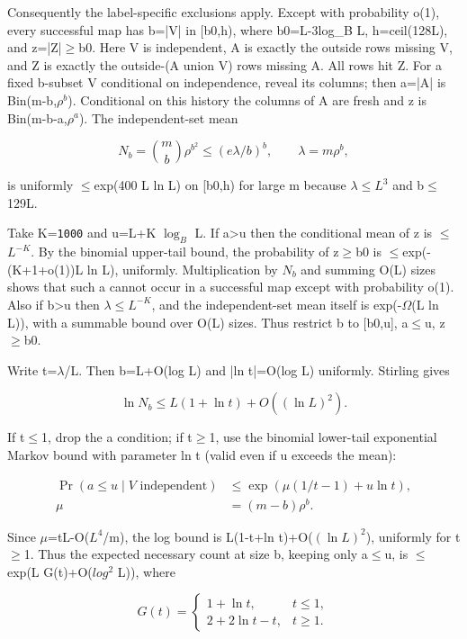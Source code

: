 \documentclass[11pt]{article}
\begin{document}
Consequently the label-specific exclusions apply. Except with probability o(1), every successful map has b=|V| in [b0,h), where b0=L-3log\_B L, h=ceil(128L), and z=|Z|\ensuremath{\geq}b0. Here V is independent, A is exactly the outside rows missing V, and Z is exactly the outside-(A union V) rows missing A. All rows hit Z. For a fixed b-subset V conditional on independence, reveal its columns; then a=|A| is Bin(m-b,$\rho^{b}$). Conditional on this history the columns of A are fresh and z is Bin(m-b-a,$\rho^{a}$). The independent-set mean

\[
N_b=\binom mb\rho^{b^2}\leq(e\lambda/b)^b,\qquad\lambda=m\rho^b,
\]

is uniformly \ensuremath{\leq}exp(400 L ln L) on [b0,h) for large m because $\lambda$\ensuremath{\leq}$L^{3}$ and b\ensuremath{\leq}129L.

Take K=\texttt{1000} and u=L+K $\log_B$ L. If a>u then the conditional mean of z is \ensuremath{\leq}$L^{-K}$. By the binomial upper-tail bound, the probability of z\ensuremath{\geq}b0 is \ensuremath{\leq}exp(-(K+1+o(1))L ln L), uniformly. Multiplication by $N_{b}$ and summing O(L) sizes shows that such a cannot occur in a successful map except with probability o(1). Also if b>u then $\lambda$\ensuremath{\leq}$L^{-K}$, and the independent-set mean itself is exp(-$\Omega$(L ln L)), with a summable bound over O(L) sizes. Thus restrict b to [b0,u], a\ensuremath{\leq}u, z\ensuremath{\geq}b0.

Write t=$\lambda$/L. Then b=L+O(log L) and |ln t|=O(log L) uniformly. Stirling gives

\[
\ln N_b\leq L(1+\ln t)+O((\ln L)^2).
\]

If t\ensuremath{\leq}1, drop the a condition; if t\ensuremath{\geq}1, use the binomial lower-tail exponential Markov bound with parameter ln t (valid even if u exceeds the mean):

\[
\begin{aligned}\Pr(a\leq u\mid V\text{ independent})&\leq\exp(\mu(1/t-1)+u\ln t),\\\mu&=(m-b)\rho^b.\end{aligned}
\]

Since $\mu$=tL-O($L^{4}$/m), the log bound is L(1-t+ln t)+O($(\ln L)^2$), uniformly for t\ensuremath{\geq}1. Thus the expected necessary count at size b, keeping only a\ensuremath{\leq}u, is \ensuremath{\leq}exp(L G(t)+O($log^{2}$ L)), where

\[
G(t)=\begin{cases}1+\ln t,&t\leq1,\\2+2\ln t-t,&t\geq1.\end{cases}
\]
\end{document}
